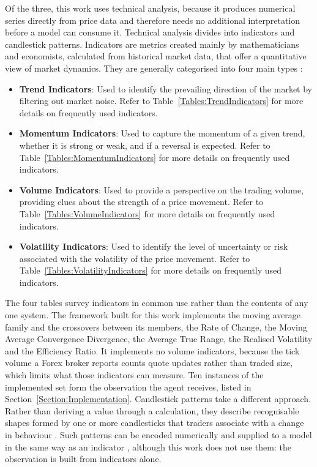 Of the three, this work uses technical analysis, because it produces numerical series directly from price data and therefore needs no additional interpretation before a model can consume it. Technical analysis divides into indicators and candlestick patterns. Indicators are metrics created mainly by mathematicians and economists, calculated from historical market data, that offer a quantitative view of market dynamics. They are generally categorised into four main types \cite{lim_handbook_2015}:

\begin{itemize}
\item \textbf{Trend Indicators}: Used to identify the prevailing direction of the market by filtering out market noise. Refer to Table~\ref{Tables:TrendIndicators} for more details on frequently used indicators.
\item \textbf{Momentum Indicators}: Used to capture the momentum of a given trend, whether it is strong or weak, and if a reversal is expected. Refer to Table~\ref{Tables:MomentumIndicators} for more details on frequently used indicators.
\item \textbf{Volume Indicators}: Used to provide a perspective on the trading volume, providing clues about the strength of a price movement. Refer to Table~\ref{Tables:VolumeIndicators} for more details on frequently used indicators.
\item \textbf{Volatility Indicators}: Used to identify the level of uncertainty or risk associated with the volatility of the price movement. Refer to Table~\ref{Tables:VolatilityIndicators} for more details on frequently used indicators.
\end{itemize}






The four tables survey indicators in common use rather than the contents of any one system. The framework built for this work implements the moving average family and the crossovers between its members, the Rate of Change, the Moving Average Convergence Divergence, the Average True Range, the Realised Volatility and the Efficiency Ratio. It implements no volume indicators, because the tick volume a Forex broker reports counts quote updates rather than traded size, which limits what those indicators can measure. Ten instances of the implemented set form the observation the agent receives, listed in Section~\ref{Section:Implementation}. Candlestick patterns take a different approach. Rather than deriving a value through a calculation, they describe recognisable shapes formed by one or more candlesticks that traders associate with a change in behaviour \cite{rhoads_candlestick_2022}. Such patterns can be encoded numerically and supplied to a model in the same way as an indicator \cite{jansen_machine_2020}, although this work does not use them: the observation is built from indicators alone.

